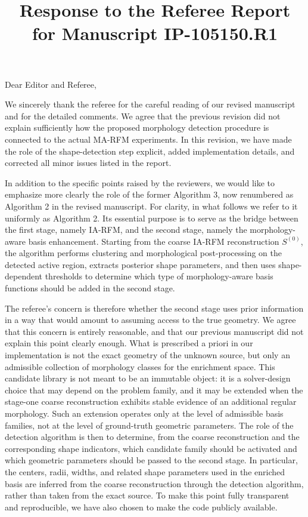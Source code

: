 \documentclass[11pt]{article}
\title{\textbf{Response to the Referee Report for Manuscript IP-105150.R1}}
\author{}
\date{}
\begin{document}
\maketitle

Dear Editor and Referee,

We sincerely thank the referee for the careful reading of our revised manuscript and for the detailed comments. We agree that the previous revision did not explain sufficiently how the proposed morphology detection procedure is connected to the actual MA-RFM experiments.
In this revision, we have made the role of the shape-detection step explicit, added implementation details, and corrected all minor issues listed in the report.

In addition to the specific points raised by the reviewers, we would like to emphasize more clearly the role of the former Algorithm 3, now renumbered as Algorithm 2 in the revised manuscript. For clarity, in what follows we refer to it uniformly as Algorithm 2. Its essential purpose is to serve as the bridge between the first stage, namely IA-RFM, and the second stage, namely the morphology-aware basis enhancement. Starting from the coarse IA-RFM reconstruction $S^{(0)}$, the algorithm performs clustering and morphological post-processing on the detected active region, extracts posterior shape parameters, and then uses shape-dependent thresholds to determine which type of morphology-aware basis functions should be added in the second stage.

The referee's concern is therefore whether the second stage uses prior information in a way that would amount to assuming access to the true geometry. We agree that this concern is entirely reasonable, and that our previous manuscript did not explain this point clearly enough.
What is prescribed a priori in our implementation is not the exact geometry of the unknown source, but only an admissible collection of morphology classes for the enrichment space. This candidate library is not meant to be an immutable object: it is a solver-design choice that may depend on the problem family, and it may be extended when the stage-one coarse reconstruction exhibits stable evidence of an additional regular morphology. 
Such an extension operates only at the level of admissible basis families, not at the level of ground-truth geometric parameters. The role of the detection algorithm is then to determine, from the coarse reconstruction and the corresponding shape indicators, which candidate family should be activated and which geometric parameters should be passed to the second stage. 
In particular, the centers, radii, widths, and related shape parameters used in the enriched basis are inferred from the coarse reconstruction through the detection algorithm, rather than taken from the exact source. To make this point fully transparent and reproducible, we have also chosen to make the code publicly available.
\end{document}
